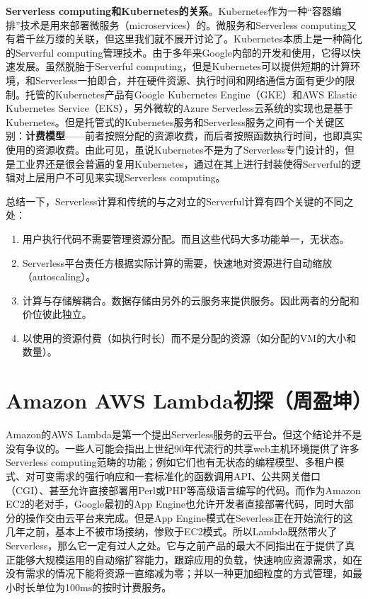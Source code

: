 \documentclass[11pt]{article}
\begin{document}
\textbf{Serverless computing和Kubernetes的关系}。Kubernetes作为一种``容器编排''技术是用来部署微服务（microservices）的\cite{jonas2019cloud}。微服务和Serverless computing又有着千丝万缕的关联，但这里我们就不展开讨论了。Kubernetes本质上是一种简化的Serverful computing管理技术。由于多年来Google内部的开发和使用，它得以快速发展。虽然脱胎于Serverful computing，但是Kubernetes可以提供短期的计算环境，和Serverless一拍即合，并在硬件资源、执行时间和网络通信方面有更少的限制。托管的Kubernetes产品有Google Kubernetes Engine（GKE）和AWS Elastic Kubernetes Service（EKS），另外微软的Azure Serverless云系统的实现也是基于Kubernetes。但是托管式的Kubernetes服务和Serverless服务之间有一个关键区别：\textbf{计费模型}——前者按照分配的资源收费，而后者按照函数执行时间，也即真实使用的资源收费\cite{jonas2019cloud}。由此可见，虽说Kubernetes不是为了Serverless专门设计的，但是工业界还是很会普遍的复用Kubernetes，通过在其上进行封装使得Serverful的逻辑对上层用户不可见来实现Serverless computing。

总结一下，Serverless计算和传统的与之对立的Serverful计算有四个关键的不同之处：
\begin{enumerate}
	\item 用户执行代码不需要管理资源分配。而且这些代码大多功能单一，无状态。
	\item Serverless平台责任方根据实际计算的需要，快速地对资源进行自动缩放（autoscaling）。
	\item 计算与存储解耦合。数据存储由另外的云服务来提供服务。因此两者的分配和价位彼此独立。
	\item 以使用的资源付费（如执行时长）而不是分配的资源（如分配的VM的大小和数量）。
\end{enumerate}

\section{Amazon AWS Lambda初探（周盈坤）}\label{sec:lambda}
Amazon的AWS Lambda是第一个提出Serverless服务的云平台。但这个结论并不是没有争议的。一些人可能会指出上世纪90年代流行的共享web主机环境提供了许多Serverless computing范畴的功能；例如它们也有无状态的编程模型、多租户模式、对可变需求的强行响应和一套标准化的函数调用API、公共网关借口（CGI）、甚至允许直接部署用Perl或PHP等高级语言编写的代码\cite{jonas2019cloud}。而作为Amazon EC2的老对手，Google最初的App Engine也允许开发者直接部署代码，同时大部分的操作交由云平台来完成。但是App Engine模式在Severless正在开始流行的这几年之前，基本上不被市场接纳，惨败于EC2模式。所以Lambda既然带火了Serverless，那么它一定有过人之处。它与之前产品的最大不同指出在于提供了真正能够大规模运用的自动缩扩容能力，跟踪应用的负载，快速响应资源需求，如在没有需求的情况下能将资源一直缩减为零；并以一种更加细粒度的方式管理，如最小时长单位为100ms的按时计费服务。
\end{document}
